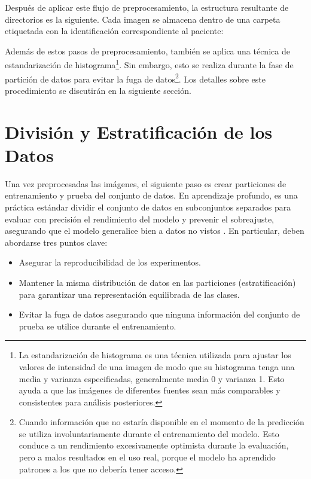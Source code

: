 \documentclass[a4paper,10pt]{book}
\begin{document}
Después de aplicar este flujo de preprocesamiento, la estructura resultante de directorios es la siguiente. Cada imagen se almacena dentro de una carpeta etiquetada con la identificación correspondiente al paciente:

\vspace{0.5cm}

Además de estos pasos de preprocesamiento, también se aplica una técnica de estandarización de histograma\footnote{La estandarización de histograma es una técnica utilizada para ajustar los valores de intensidad de una imagen de modo que su histograma tenga una media y varianza especificadas, generalmente media 0 y varianza 1. Esto ayuda a que las imágenes de diferentes fuentes sean más comparables y consistentes para análisis posteriores.}. Sin embargo, esto se realiza durante la fase de partición de datos para evitar la fuga de datos\footnote{Cuando información que no estaría disponible en el momento de la predicción se utiliza involuntariamente durante el entrenamiento del modelo. Esto conduce a un rendimiento excesivamente optimista durante la evaluación, pero a malos resultados en el uso real, porque el modelo ha aprendido patrones a los que no debería tener acceso.}. Los detalles sobre este procedimiento se discutirán en la siguiente sección.

\section{División y Estratificación de los Datos}

Una vez preprocesadas las imágenes, el siguiente paso es crear particiones de entrenamiento y prueba del conjunto de datos. En aprendizaje profundo, es una práctica estándar dividir el conjunto de datos en subconjuntos separados para evaluar con precisión el rendimiento del modelo y prevenir el sobreajuste, asegurando que el modelo generalice bien a datos no vistos \cite{noauthor_data_nodate}. En particular, deben abordarse tres puntos clave:

\begin{itemize}
\item Asegurar la reproducibilidad de los experimentos.
\item Mantener la misma distribución de datos en las particiones (estratificación) para garantizar una representación equilibrada de las clases.
\item Evitar la fuga de datos asegurando que ninguna información del conjunto de prueba se utilice durante el entrenamiento.
\end{itemize}
\end{document}
